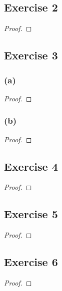 \documentclass[14pt]{extarticle}
\begin{document}
\subsection{Exercise 2}

\begin{proof}

\end{proof}

\subsection{Exercise 3}

\subsubsection{(a)}

\begin{proof}

\end{proof}

\subsubsection{(b)}

\begin{proof}

\end{proof}

\subsection{Exercise 4}

\begin{proof}

\end{proof}

\subsection{Exercise 5}

\begin{proof}

\end{proof}

\subsection{Exercise 6}

\begin{proof}

\end{proof}
\end{document}

